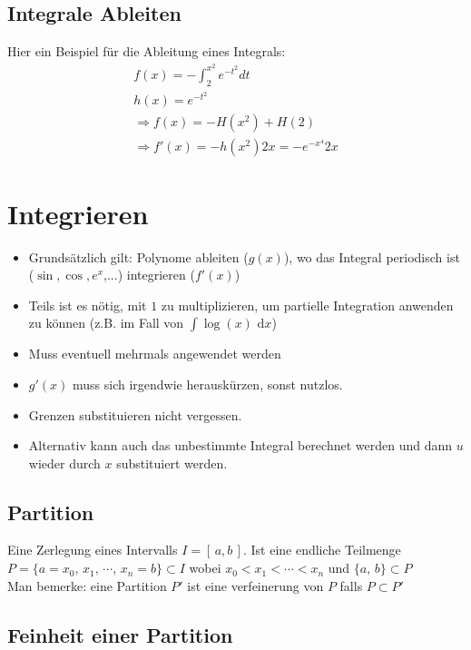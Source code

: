 \documentclass[8pt]{extarticle}
\def\dx{\text{ d}x}
\begin{document}
\begin{multicols*}{3}
\subsection{Integrale Ableiten}

Hier ein Beispiel für die Ableitung eines Integrals:
\begin{align*}
  f(x) = -\int_2^{x^2} e^{-t^2} dt\\
  h(x) = e^{-t^2}\\
  \Rightarrow f(x) = - H(x^2) + H(2)\\
  \Rightarrow f'(x) = - h(x^2) 2x = -e^{-x^4} 2x
\end{align*}
\newpage
\section{Integrieren}
\hypertarget{sec:4}{}

\begin{itemize}
 \item Grundsätzlich gilt: Polynome ableiten ($g(x)$), wo das Integral periodisch ist ($\sin, \cos, e^x$,...) integrieren ($f'(x)$)
 \item Teils ist es nötig, mit $1$ zu multiplizieren, um partielle Integration anwenden zu können (z.B. im Fall von $\int \log(x) \dx$)
 \item Muss eventuell mehrmals angewendet werden
 \item $g'(x)$ muss sich irgendwie herauskürzen, sonst nutzlos.
 \item Grenzen substituieren nicht vergessen.
 \item Alternativ kann auch das unbestimmte Integral berechnet werden und dann $u$ wieder durch $x$ substituiert werden.
\end{itemize}

\subsection{Partition}

Eine Zerlegung eines Intervalls $I = [\,a, b\,]$. Ist eine endliche Teilmenge
$P = \{a = x_0,\, x_1,\, \cdots,\, x_n = b\} \subset I$ wobei $x_0 < x_1 < \cdots < x_n$ und $\{a,\, b\} \subset P$
\\
Man bemerke: eine Partition $P'$ ist eine verfeinerung von $P$ falls $P \subset P'$

\subsection{Feinheit einer Partition}


\end{multicols*}
\end{document}
